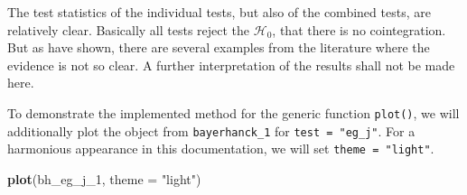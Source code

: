 \documentclass[12pt,a4paper]{article}
\newenvironment{Shaded}{\begin{snugshade}}{\end{snugshade}}
\newcommand{\CommentTok}[1]{\textcolor[rgb]{0.56,0.35,0.01}{\textit{#1}}}
\newcommand{\ControlFlowTok}[1]{\textcolor[rgb]{0.13,0.29,0.53}{\textbf{#1}}}
\newcommand{\DataTypeTok}[1]{\textcolor[rgb]{0.13,0.29,0.53}{#1}}
\newcommand{\DecValTok}[1]{\textcolor[rgb]{0.00,0.00,0.81}{#1}}
\newcommand{\FloatTok}[1]{\textcolor[rgb]{0.00,0.00,0.81}{#1}}
\newcommand{\KeywordTok}[1]{\textcolor[rgb]{0.13,0.29,0.53}{\textbf{#1}}}
\newcommand{\NormalTok}[1]{#1}
\newcommand{\OperatorTok}[1]{\textcolor[rgb]{0.81,0.36,0.00}{\textbf{#1}}}
\newcommand{\StringTok}[1]{\textcolor[rgb]{0.31,0.60,0.02}{#1}}
\begin{document}
\begin{Shaded}
\end{Shaded}

The test statistics of the individual tests, but also of the combined
tests, are relatively clear. Basically all tests reject the
\(\mathcal{H}_0\), that there is no cointegration. But as
\textcite{Bayerhanck2009} have shown, there are several examples from
the literature where the evidence is not so clear. A further
interpretation of the results shall not be made here.

To demonstrate the implemented method for the generic function
\texttt{plot()}, we will additionally plot the object from
\texttt{bayerhanck\_1} for \texttt{test\ =\ "eg\_j"}. For a harmonious
appearance in this documentation, we will set
\texttt{theme\ =\ "light"}.

\begin{Shaded}
\begin{Highlighting}[]
\KeywordTok{plot}\NormalTok{(bh_eg_j_}\DecValTok{1}\NormalTok{, }\DataTypeTok{theme =} \StringTok{"light"}\NormalTok{)}
\end{Highlighting}
\end{Shaded}
\end{document}
